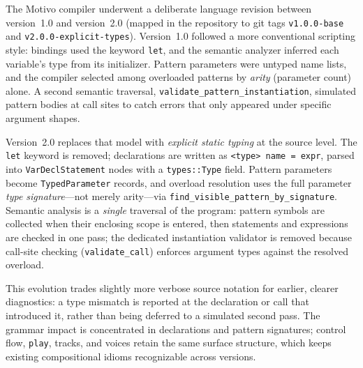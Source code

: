The Motivo compiler underwent a deliberate language revision between version~1.0 and version~2.0 (mapped in the
repository to git tags \texttt{v1.0.0-base} and \texttt{v2.0.0-explicit-types}).
Version~1.0 followed a more conventional scripting style: bindings used the keyword \texttt{let}, and the semantic
analyzer inferred each variable's type from its initializer.
Pattern parameters were untyped name lists, and the compiler selected among overloaded patterns by \textit{arity}
(parameter count) alone.
A second semantic traversal, \texttt{validate\_pattern\_instantiation}, simulated pattern bodies at call sites to catch
errors that only appeared under specific argument shapes.

Version~2.0 replaces that model with \textit{explicit static typing} at the source level.
The \texttt{let} keyword is removed; declarations are written as \texttt{<type> name = expr}, parsed into
\texttt{VarDeclStatement} nodes with a \texttt{types::Type} field.
Pattern parameters become \texttt{TypedParameter} records, and overload resolution uses the full parameter
\textit{type signature}---not merely arity---via \texttt{find\_visible\_pattern\_by\_signature}.
Semantic analysis is a \textit{single} traversal of the program: pattern symbols are collected when their enclosing
scope is entered, then statements and expressions are checked in one pass; the dedicated instantiation validator is
removed because call-site checking (\texttt{validate\_call}) enforces argument types against the resolved overload.

This evolution trades slightly more verbose source notation for earlier, clearer diagnostics: a type mismatch is
reported at the declaration or call that introduced it, rather than being deferred to a simulated second pass.
The grammar impact is concentrated in declarations and pattern signatures; control flow, \texttt{play}, tracks, and
voices retain the same surface structure, which keeps existing compositional idioms recognizable across versions.
